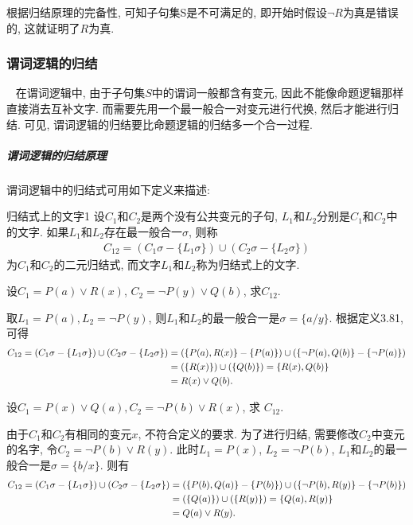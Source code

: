 根据归结原理的完备性, 可知子句集S是不可满足的, 即开始时假设$\neg R$为真是错误的, 这就证明了$R$为真.

\subsubsection{谓词逻辑的归结}~{}
    在谓词逻辑中, 由于子句集$S$中的谓词一般都含有变元, 因此不能像命题逻辑那样直接消去互补文字. 而需要先用一个最一般合一对变元进行代换, 然后才能进行归结. 可见, 谓词逻辑的归结要比命题逻辑的归结多一个合一过程.
\subparagraph{谓词逻辑的归结原理}
    谓词逻辑中的归结式可用如下定义来描述:
\begin{mydef}{归结式上的文字}{1}
    设$C_1$和$C_2$是两个没有公共变元的子句, $L_1$和$L_2$分别是$C_1$和$C_2$中的文字. 如果$L_1$和$L_2$存在最一般合一$\sigma$, 则称
    \begin{align}
      C_{12}=({C_1\sigma }-\{ L_1\sigma\})\cup ({ C_2\sigma }-\{ L_2\sigma \})
    \end{align}
    为$C_1$和$C_2$的二元归结式, 而文字$L_1$和$L_2$称为归结式上的文字.\label{AI32Def321}
\end{mydef}
\begin{example}
  设$C_1=P(a)\vee R(x)$, $C_2=\neg P(y)\vee Q(b)$, 求$C_{12}$.
\end{example}
\begin{result}
取$L_1= P(a),  L_2=\neg P(y)$, 则$L_1$和$L_2$的最一般合一是$\sigma=\{a/y\}$. 根据定义3.81,可得
\begin{align}
C_{12}=( {C_1\sigma }-\{L_1\sigma \}) \cup  ({C_2 \sigma }-\{L_2\sigma \})
              &=(\{P(a), R(x)\}-\{P(a)\})\cup (\{\neg P(a), Q(b)\}-\{\neg P(a)\})\notag\\
              &=(\{R(x)\})\cup(\{Q(b)\})= \{R(x), Q(b)\}\notag\\
              &=R(x)\vee Q(b).
\end{align}
\end{result}
\begin{example}
    设$C_1=P(x)\vee Q(a), C_2=\neg P(b)\vee R(x)$, 求 $C_{12}$.
\end{example}
\begin{result}
由于$C_1$和$C_2$有相同的变元$x$, 不符合定义\label{defqibenzj}的要求. 为了进行归结, 需要修改$C_2$中变元的名字, 令$C_2=\neg P(b)\vee R(y)$.
此时$L_1= P(x)$, $L_2 =\neg P(b)$, $L_1$和$L_2$的最一般合一是$\sigma =\{b/x\}$. 则有
\begin{align}
C_{12}=( {C_1\sigma }-\{L_1\sigma\})\cup  ({C_2\sigma }-\{L_2\sigma \})
            &=(\{P(b), Q(a)\}-\{P(b)\}) \cup  (\{\neg P(b), R(y)\}-\{\neg P(b)\})\notag\\
            &=(\{Q(a)\}) \cup  (\{R(y)\})= \{Q(a), R(y)\}\notag\\
            &=Q(a)\vee R(y).
\end{align}
\end{result}

